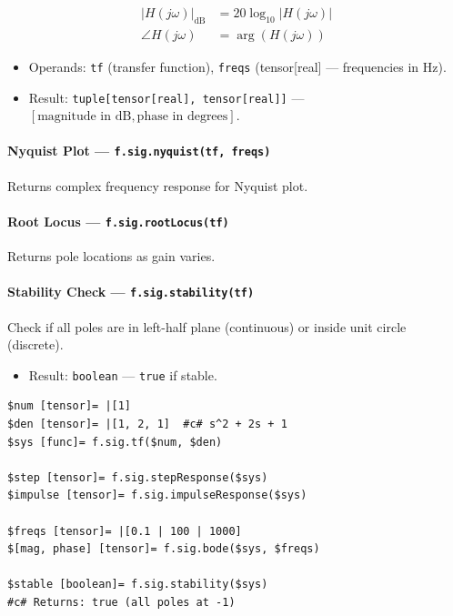 \begin{align}
|H(j\omega)|_{\text{dB}} &= 20 \log_{10}|H(j\omega)| \label{eq:sig-bode-mag} \\
\angle H(j\omega) &= \arg(H(j\omega)) \label{eq:sig-bode-phase}
\end{align}

\begin{itemize}
\item Operands: \texttt{tf} (transfer function), \texttt{freqs} (tensor[real] --- frequencies in Hz).
\item Result: \texttt{tuple[tensor[real], tensor[real]]} --- $[\text{magnitude in dB}, \text{phase in degrees}]$.
\end{itemize}

\paragraph{Nyquist Plot --- \texttt{f.sig.nyquist(tf, freqs)}}
Returns complex frequency response for Nyquist plot.

\paragraph{Root Locus --- \texttt{f.sig.rootLocus(tf)}}
Returns pole locations as gain varies.

\paragraph{Stability Check --- \texttt{f.sig.stability(tf)}}
Check if all poles are in left-half plane (continuous) or inside unit circle (discrete).

\begin{itemize}
\item Result: \texttt{boolean} --- \texttt{true} if stable.
\end{itemize}

\begin{verbatim}
$num [tensor]= |[1]
$den [tensor]= |[1, 2, 1]  #c# s^2 + 2s + 1
$sys [func]= f.sig.tf($num, $den)

$step [tensor]= f.sig.stepResponse($sys)
$impulse [tensor]= f.sig.impulseResponse($sys)

$freqs [tensor]= |[0.1 | 100 | 1000]
$[mag, phase] [tensor]= f.sig.bode($sys, $freqs)

$stable [boolean]= f.sig.stability($sys)
#c# Returns: true (all poles at -1)
\end{verbatim}


